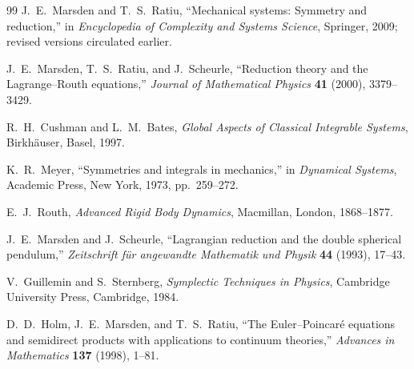 \documentclass[11pt,a4paper]{article}
\theoremstyle{definition}
\begin{document}
\begin{thebibliography}{99}
J.~E.~Marsden and T.~S.~Ratiu,
``Mechanical systems: Symmetry and reduction,''
in \emph{Encyclopedia of Complexity and Systems Science},
Springer, 2009; revised versions circulated earlier.

J.~E.~Marsden, T.~S.~Ratiu, and J.~Scheurle,
``Reduction theory and the Lagrange--Routh equations,''
\emph{Journal of Mathematical Physics} \textbf{41} (2000), 3379--3429.

R.~H.~Cushman and L.~M.~Bates,
\emph{Global Aspects of Classical Integrable Systems},
Birkhäuser, Basel, 1997.

K.~R.~Meyer,
``Symmetries and integrals in mechanics,''
in \emph{Dynamical Systems}, Academic Press, New York, 1973, pp.~259--272.

E.~J.~Routh,
\emph{Advanced Rigid Body Dynamics},
Macmillan, London, 1868--1877.

J.~E.~Marsden and J.~Scheurle,
``Lagrangian reduction and the double spherical pendulum,''
\emph{Zeitschrift für angewandte Mathematik und Physik} \textbf{44} (1993),
17--43.

V.~Guillemin and S.~Sternberg,
\emph{Symplectic Techniques in Physics},
Cambridge University Press, Cambridge, 1984.

D.~D.~Holm, J.~E.~Marsden, and T.~S.~Ratiu,
``The Euler--Poincaré equations and semidirect products with applications to
continuum theories,''
\emph{Advances in Mathematics} \textbf{137} (1998), 1--81.

\end{thebibliography}
\end{document}
